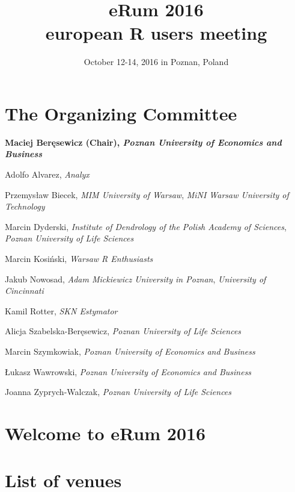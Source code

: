 \documentclass[11pt,twoside,b5paper]{book}
\title{eRum 2016 \\ european R users meeting}
\author{October 12-14, 2016 in Poznan, Poland}
\date{}
\begin{document}


\clearpage

\frontmatter
\maketitle

\begin{small}
\tableofcontents
\end{small}

\mainmatter

\chapter{The Organizing Committee}

\textbf{Maciej Beręsewicz (Chair), \textit{Poznan University of Economics and Business}}

Adolfo Alvarez, \textit{Analyx}

Przemysław Biecek, \textit{MIM University of Warsaw}, \textit{MiNI Warsaw University of Technology}

Marcin Dyderski, \textit{Institute of Dendrology of the Polish Academy of Sciences}, \textit{Poznan University of Life Sciences}

Marcin Kosiński, \textit{Warsaw R Enthusiasts}

Jakub Nowosad, \textit{Adam Mickiewicz University in Poznan}, \textit{University of Cincinnati}

Kamil Rotter, \textit{SKN Estymator}

Alicja Szabelska-Beręsewicz, \textit{Poznan University of Life Sciences}

Marcin Szymkowiak, \textit{Poznan University of Economics and Business}

Łukasz Wawrowski, \textit{Poznan University of Economics and Business}

Joanna Zyprych-Walczak, \textit{Poznan University of Life Sciences}

\chapter{Welcome to eRum 2016}



\chapter{List of venues}

\end{document}
